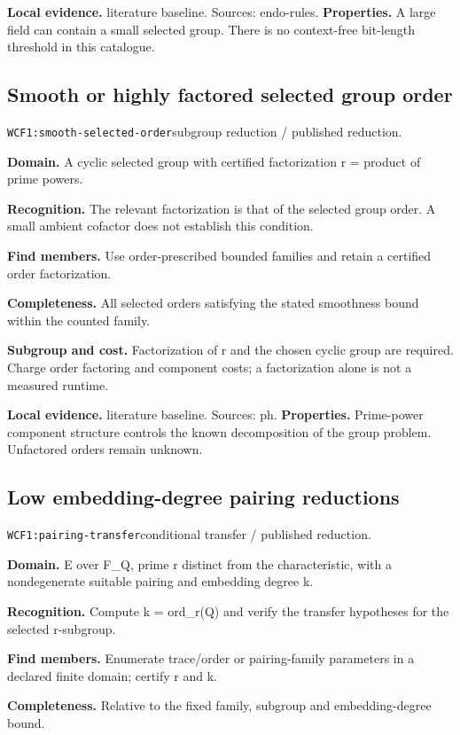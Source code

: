 \documentclass[10pt]{article}
\begin{document}
\textbf{Local evidence.} literature baseline. Sources: endo-rules.
\textbf{Properties.} A large field can contain a small selected group. There is no context-free bit-length threshold in this catalogue.\par
{}\subsection{Smooth or highly factored selected group order}
\texttt{WCF1:smooth-selected-order}\quad subgroup reduction / published reduction.\par
\textbf{Domain.} A cyclic selected group with certified factorization r = product of prime powers.\par
\textbf{Recognition.} The relevant factorization is that of the selected group order. A small ambient cofactor does not establish this condition.\par
\textbf{Find members.} Use order-prescribed bounded families and retain a certified order factorization.\par
\textbf{Completeness.} All selected orders satisfying the stated smoothness bound within the counted family.\par
\textbf{Subgroup and cost.} Factorization of r and the chosen cyclic group are required. Charge order factoring and component costs; a factorization alone is not a measured runtime.\par
\textbf{Local evidence.} literature baseline. Sources: ph.
\textbf{Properties.} Prime-power component structure controls the known decomposition of the group problem. Unfactored orders remain unknown.\par
{}\subsection{Low embedding-degree pairing reductions}
\texttt{WCF1:pairing-transfer}\quad conditional transfer / published reduction.\par
\textbf{Domain.} E over F\_Q, prime r distinct from the characteristic, with a nondegenerate suitable pairing and embedding degree k.\par
\textbf{Recognition.} Compute k = ord\_r(Q) and verify the transfer hypotheses for the selected r-subgroup.\par
\textbf{Find members.} Enumerate trace/order or pairing-family parameters in a declared finite domain; certify r and k.\par
\textbf{Completeness.} Relative to the fixed family, subgroup and embedding-degree bound.\par
\end{document}

